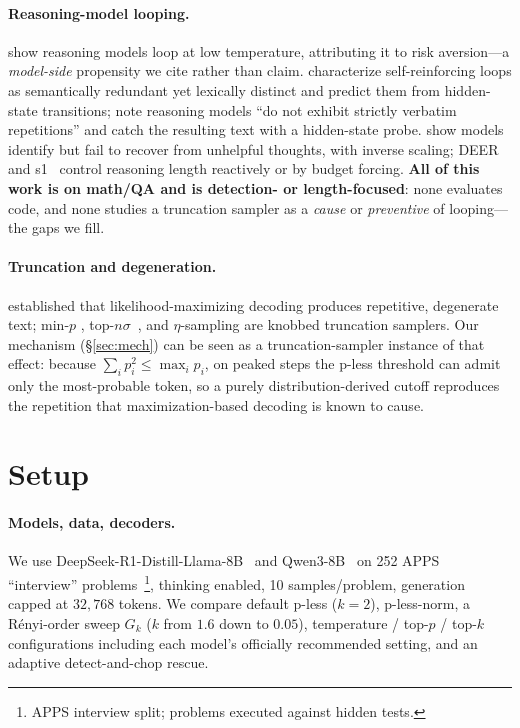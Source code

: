 \documentclass[11pt]{article}                       %
\newcommand{\tsum}{\ensuremath{\textstyle\sum}}
\begin{document}
\paragraph{Reasoning-model looping.} \citet{pipis2025loop} show reasoning models loop at low
temperature, attributing it to risk aversion---a \emph{model-side} propensity we cite rather than
claim. \citet{duan2026circular} characterize self-reinforcing loops as semantically redundant yet
lexically distinct and predict them from hidden-state transitions; \citet{xie2025wordsalad} note
reasoning models ``do not exhibit strictly verbatim repetitions'' and catch the resulting text with a
hidden-state probe. \citet{yang2025recover} show models identify but fail to recover from unhelpful
thoughts, with inverse scaling; DEER~\citep{yang2025deer} and s1~\citep{muennighoff2025s1} control
reasoning length reactively or by budget forcing. \textbf{All of this work is on math/QA and is
detection- or length-focused}: none evaluates code, and none studies a truncation sampler as a
\emph{cause} or \emph{preventive} of looping---the gaps we fill.

\paragraph{Truncation and degeneration.} \citet{holtzman2020curious} established that
likelihood-maximizing decoding produces repetitive, degenerate text; min-$p$
\citep{nguyen2024minp}, top-$n\sigma$~\citep{tang2024topnsigma}, and $\eta$-sampling
\citep{hewitt2022truncation} are knobbed truncation samplers. Our mechanism (\S\ref{sec:mech}) can be
seen as a truncation-sampler instance of that effect: because $\tsum_i p_i^2 \le \max_i p_i$, on
peaked steps the p-less threshold can admit only the most-probable token, so a purely
distribution-derived cutoff reproduces the repetition that maximization-based decoding is known to cause.

\section{Setup}\label{sec:setup}
\paragraph{Models, data, decoders.} We use DeepSeek-R1-Distill-Llama-8B~\citep{deepseekai2025r1} and
Qwen3-8B~\citep{yang2025qwen3} on 252 APPS ``interview'' problems~\citep{hendrycks2021apps}\footnote{APPS
interview split; problems executed against hidden tests.}, thinking enabled, 10 samples/problem,
generation capped at $32{,}768$ tokens. We
compare default p-less ($k{=}2$), p-less-norm, a R\'enyi-order sweep $G_k$ ($k$ from $1.6$ down to
$0.05$), temperature / top-$p$ / top-$k$ configurations including each model's officially recommended
setting, and an adaptive detect-and-chop rescue.
\end{document}
